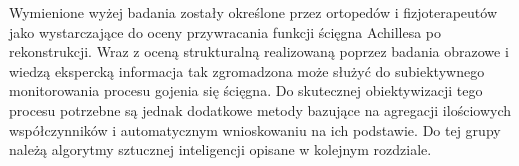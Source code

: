 Wymienione wyżej badania zostały określone przez ortopedów i fizjoterapeutów jako wystarczające do oceny przywracania funkcji ścięgna Achillesa po rekonstrukcji. Wraz z oceną strukturalną realizowaną poprzez badania obrazowe i wiedzą ekspercką informacja tak zgromadzona może służyć do subiektywnego monitorowania procesu gojenia się ścięgna. Do skutecznej obiektywizacji tego procesu potrzebne są jednak dodatkowe metody bazujące na agregacji ilościowych współczynników i automatycznym wnioskowaniu na ich podstawie. Do tej grupy należą algorytmy sztucznej inteligencji opisane w kolejnym rozdziale. 